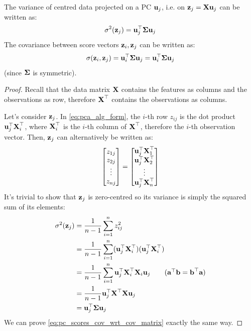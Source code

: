 \documentclass[a4paper]{article}
\begin{document}
\begin{lemma}
\label{lem:var_wrt_cov_matrix}
The variance of centred data projected on a PC $\textbf{u}_j$, i.e. on $\textbf{z}_j = \textbf{X}\textbf{u}_j$ can be written as:
\begin{equation}
    \sigma^2(\textbf{z}_j) = \textbf{u}_j^{\top}\boldsymbol{\Sigma}\textbf{u}_j
    \label{eq:pc_score_wrt_cov_matrix}
\end{equation}
The covariance between score vectors $\textbf{z}_i, \textbf{z}_j$ can be written as:
\begin{equation}
	\sigma(\textbf{z}_i,\textbf{z}_j) = \textbf{u}_i^{\top}\boldsymbol{\Sigma}\textbf{u}_j = \textbf{u}_i^{\top}\boldsymbol{\Sigma}\textbf{u}_j
	\label{eq:pc_scores_cov_wrt_cov_matrix}
\end{equation}
	(since $\boldsymbol{\Sigma}$ is symmetric).
\end{lemma}
\begin{proof}
	Recall that the data matrix $\textbf{X}$ contains the features as columns and the observations as row, therefore $\textbf{X}^{\top}$ contains the observations as columns.

	Let's consider $\textbf{z}_j$. In \eqref{eq:pca_alg_form}, the $i$-th row $z_{ij}$ is the dot product $\textbf{u}_j^{\top}\textbf{X}_i^{\top}$, where $\textbf{X}_i^{\top}$ is the $i$-th column of $\textbf{X}^{\top}$, therefore the $i$-th observation vector. Then, $\textbf{z}_j$ can alternatively be written as:
	\[
		\begin{bmatrix}
			z_{1j} \\ z_{2j} \\ \vdots \\ z_{nj}	
		\end{bmatrix} = 
		\begin{bmatrix}
			\textbf{u}_j^{\top}\textbf{X}_1^{\top}	\\ \textbf{u}_j^{\top}\textbf{X}_2^{\top}	\\ \vdots \\ \textbf{u}_j^{\top}\textbf{X}_n^{\top}	\\
		\end{bmatrix}
	\]
	It's trivial to show that $\textbf{z}_j$ is zero-centred so its variance is simply the squared sum of its elements:
	\begin{align*}
	    \sigma^2(\bz_j) &= \frac{1}{n-1}\sum\limits_{i=1}^n{z_{ij}^2} \\
	    &= \frac{1}{n-1}\sum\limits_{i=1}^n(\bu_j\t\bX_i\t)(\bu_j\t\bX_i\t) \\
	    &= \frac{1}{n-1}\sum\limits_{i=1}^n \bu_j\t\bX_i\t\bX_i\bu_j  \tag*{($\ba\t\textbf{b}=\textbf{b}\t\ba$)}\\
	    &= \frac{1}{n-1}\bu_j\t\bX\t\bX\bu_j\\
	    & = \bu_j\t\bSigma\bu_j
	\end{align*}
	We can prove \eqref{eq:pc_scores_cov_wrt_cov_matrix} exactly the same way.
\end{proof}
\end{document}
